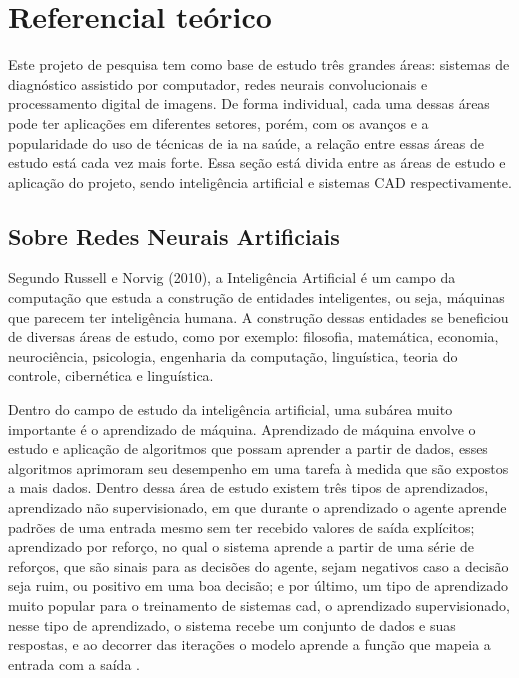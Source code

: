 \section{Referencial teórico}

Este projeto de pesquisa tem como base de estudo três grandes áreas: sistemas de diagnóstico assistido por computador, redes neurais convolucionais e processamento digital de imagens. De forma individual, cada uma dessas áreas pode ter aplicações em diferentes setores, porém, com os avanços e a popularidade do uso de técnicas de \gls{ia} na saúde, a relação entre essas áreas de estudo está cada vez mais forte. Essa seção está divida entre as áreas de estudo e aplicação do projeto, sendo inteligência artificial e sistemas CAD respectivamente.


\subsection{Sobre Redes Neurais Artificiais}

Segundo Russell e Norvig (2010), a Inteligência Artificial  é um campo da computação que estuda a construção de entidades inteligentes, ou seja, máquinas que parecem ter inteligência humana. A construção dessas entidades se beneficiou de diversas áreas de estudo, como por exemplo: filosofia, matemática, economia, neurociência, psicologia, engenharia da computação, linguística, teoria do controle, cibernética e linguística.


Dentro do campo de estudo da inteligência artificial, uma subárea muito importante é o aprendizado de máquina. Aprendizado de máquina envolve o estudo e aplicação de algoritmos que possam aprender a partir de dados, esses algoritmos aprimoram seu desempenho em uma tarefa à medida que são expostos a mais dados. Dentro dessa área de estudo existem três tipos de aprendizados, aprendizado não supervisionado, em que durante o aprendizado o agente aprende padrões de uma entrada mesmo sem ter recebido valores de saída explícitos; aprendizado por reforço, no qual o sistema aprende a partir de uma série de reforços, que são sinais para as decisões do agente, sejam negativos caso a decisão seja ruim, ou positivo em uma boa decisão; e por último, um tipo de aprendizado muito popular para o treinamento de sistemas \gls{cad}, o aprendizado supervisionado, nesse tipo de aprendizado, o sistema recebe um conjunto de dados e suas respostas, e ao decorrer das iterações o modelo aprende a função que mapeia a entrada com a saída \cite{haykin2009neural}.

